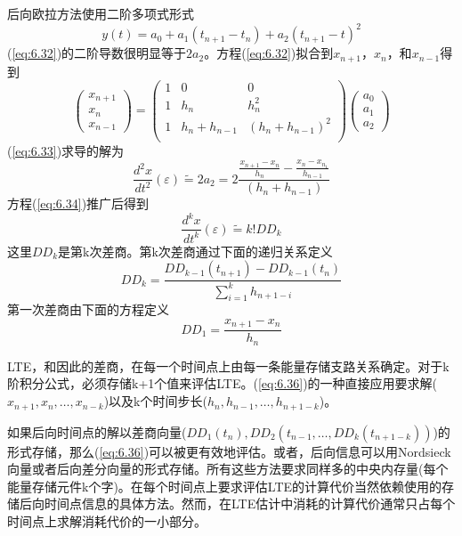 后向欧拉方法使用二阶多项式形式
\begin{equation}
    y(t) = a_0 + a_1(t_{n+1}-t_n) + a_2(t_{n+1}-t)^2
    \label{eq:6.32}
\end{equation}
(\ref{eq:6.32})的二阶导数很明显等于$2a_2$。方程(\ref{eq:6.32})拟合到$x_{n+1}$，$x_n$，和$x_{n-1}$得到
\begin{equation}
    \begin{pmatrix}
x_{n+1} \\
x_n \\
x_{n-1}
\end{pmatrix}=\begin{pmatrix}
1 &0  &0  \\
1 &h_n  &h^2_n  \\
1 &h_n + h_{n-1}  &(h_n+h_{n-1})^2  \\
\end{pmatrix}\begin{pmatrix}
a_0 \\
a_1 \\
a_2
\end{pmatrix}
\label{eq:6.33}
\end{equation}
(\ref{eq:6.33})求导的解为
\begin{equation}
    \frac{d^2x}{dt^2}(\varepsilon) \widetilde{=} 2a_2 = 2\frac{\frac{x_{n+1}-x_n}{h_n}-\frac{x_n-x_{n_1}}{h_{n-1}}}{(h_n + h_{n-1})}
    \label{eq:6.34}
\end{equation}
方程(\ref{eq:6.34})推广后得到\cite{ref-49}
\begin{equation}
    \frac{d^kx}{dt^k}(\varepsilon) \widetilde{=} k!DD_k
    \label{eq:6.35}
\end{equation}
这里$DD_k$是第k次差商。第k次差商通过下面的递归关系定义
\begin{equation}
DD_k = \frac{DD_{k-1}(t_{n+1})-DD_{k-1}(t_n)}{\sum^k_{i=1}h_{n+1-i}}
\label{eq:6.36}
\end{equation}
第一次差商由下面的方程定义
\begin{equation}
    DD_1 = \frac{x_{n+1}-x_n}{h_n}
    \label{eq:6.37}
\end{equation}

LTE，和因此的差商，在每一个时间点上由每一条能量存储支路关系确定。对于k阶积分公式，必须存储k+1个值来评估LTE。(\ref{eq:6.36})的一种直接应用要求解($x_{n+1},x_n,\dots,x_{n-k}$)以及k个时间步长($h_n,h_{n-1},\dots,h_{n+1-k}$)。

如果后向时间点的解以差商向量($DD_1(t_n), DD_2(t_{n-1}, \dots, DD_k(t_{n+1-k}))$)的形式存储，那么(\ref{eq:6.36})可以被更有效地评估。或者，后向信息可以用Nordsieck向量\cite{ref-69}或者后向差分向量\cite{ref-70}的形式存储。所有这些方法要求同样多的中央内存量(每个能量存储元件k个字)。在每个时间点上要求评估LTE的计算代价当然依赖使用的存储后向时间点信息的具体方法。然而，在LTE估计中消耗的计算代价通常只占每个时间点上求解消耗代价的一小部分。

